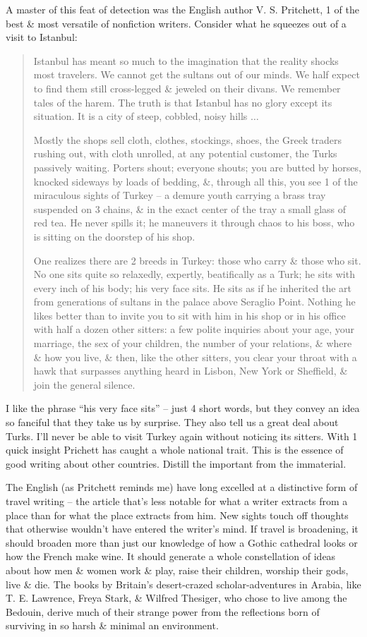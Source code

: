 \documentclass{article}
\begin{document}
A master of this feat of detection was the English author V. S. Pritchett, 1 of the best \& most versatile of nonfiction writers. Consider what he squeezes out of a visit to Istanbul:
\begin{quotation}
	Istanbul has meant so much to the imagination that the reality shocks most travelers. We cannot get the sultans out of our minds. We half expect to find them still cross-legged \& jeweled on their divans. We remember tales of the harem. The truth is  that Istanbul has no glory except its situation. It is a city of steep, cobbled, noisy hills $\ldots$
	
	Mostly the shops sell cloth, clothes, stockings, shoes, the Greek traders rushing out, with cloth unrolled, at any potential customer, the Turks passively waiting. Porters shout; everyone shouts; you are butted by horses, knocked sideways by loads of bedding, \&, through all this, you see 1 of the miraculous sights of Turkey -- a demure youth carrying a brass tray suspended on 3 chains, \& in the exact center of the tray a small glass of red tea. He never spills it; he maneuvers it through chaos to his boss, who is sitting on the doorstep of his shop.
	
	One realizes there are 2 breeds in Turkey: those who carry \& those who sit. No one sits quite so relaxedly, expertly, beatifically as a Turk; he sits with every inch of his body; his very face sits. He sits as if he inherited the art from generations of sultans in the palace above Seraglio Point. Nothing he likes better than to invite you to sit with him in his shop or in his office with half a dozen other sitters: a few polite inquiries about your age, your marriage, the sex of your children, the number of your relations, \& where \& how you live, \& then, like the other sitters, you clear your throat with a hawk that surpasses anything heard in Lisbon, New York or Sheffield, \& join the general silence.
\end{quotation}
I like the phrase ``his very face sits'' -- just 4 short words, but they convey an idea so fanciful that they take us by surprise. They also tell us a great deal about Turks. I'll never be able to visit Turkey again without noticing its sitters. With 1 quick insight Prichett has caught a whole national trait. This is the essence of good writing about other countries. Distill the important from the immaterial.

The English (as Pritchett reminds me) have long excelled at a distinctive form of travel writing -- the article that's less notable for what a writer extracts from a place than for what the place extracts from him. New sights touch off thoughts that otherwise wouldn't have entered the writer's mind. If travel is broadening, it should broaden more than just our knowledge of how a Gothic cathedral looks or how the French make wine. It should generate a whole constellation of ideas about how men \& women work \& play, raise their children, worship their gods, live \& die. The books by Britain's desert-crazed scholar-adventures in Arabia, like T. E. Lawrence, Freya Stark, \& Wilfred Thesiger, who chose to live among the Bedouin, derive much of their strange power from the reflections born of surviving in so harsh \& minimal an environment.
\end{document}

